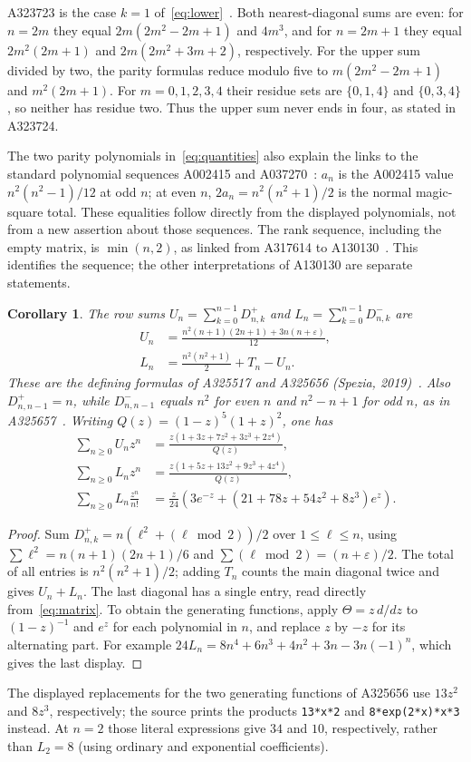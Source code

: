 \documentclass[11pt]{article}
\newtheorem{corollary}[theorem]{Corollary}
\newcommand{\eps}{\varepsilon}
\begin{document}
A323723 is the case $k=1$ of~\eqref{eq:lower}~\cite{s323723}.
Both nearest-diagonal sums are even: for $n=2m$ they equal
$2m(2m^2-2m+1)$ and $4m^3$, and for $n=2m+1$ they equal
$2m^2(2m+1)$ and $2m(2m^2+3m+2)$, respectively.
For the upper sum divided by two, the parity formulas reduce modulo five
to $m(2m^2-2m+1)$ and $m^2(2m+1)$. For $m=0,1,2,3,4$ their
residue sets are $\{0,1,4\}$ and $\{0,3,4\}$, so neither has residue
two. Thus the upper sum never ends in four, as stated in A323724.

The two parity polynomials in~\eqref{eq:quantities} also explain the
links to the standard polynomial sequences A002415 and
A037270~\cite{s002415,s037270}:
$a_n$ is the A002415 value $n^2(n^2-1)/12$ at odd $n$;
at even $n$, $2a_n=n^2(n^2+1)/2$ is the normal magic-square total.
These equalities follow directly from the displayed polynomials, not
from a new assertion about those sequences.
The rank sequence, including the empty matrix, is $\min(n,2)$, as linked
from A317614 to A130130~\cite{s130130}. This identifies the sequence;
the other interpretations of A130130 are separate statements.

\begin{corollary}\label{cor:triangles}
The row sums $U_n=\sum_{k=0}^{n-1}D^+_{n,k}$ and
$L_n=\sum_{k=0}^{n-1}D^-_{n,k}$ are
\begin{align*}
U_n&=\frac{n^2(n+1)(2n+1)+3n(n+\eps)}{12},\\
L_n&=\frac{n^2(n^2+1)}2+T_n-U_n.
\end{align*}
These are the defining formulas of A325517 and A325656
(Spezia, 2019)~\cite{s325517,s325656}. Also
$D^+_{n,n-1}=n$, while $D^-_{n,n-1}$ equals $n^2$ for even $n$
and $n^2-n+1$ for odd $n$, as in A325657~\cite{s325657}.
Writing $Q(z)=(1-z)^5(1+z)^2$, one has
\begin{align*}
\sum_{n\geq0}U_nz^n&=\frac{z(1+3z+7z^2+3z^3+2z^4)}{Q(z)},\\
\sum_{n\geq0}L_nz^n&=\frac{z(1+5z+13z^2+9z^3+4z^4)}{Q(z)},\\
\sum_{n\geq0}L_n\frac{z^n}{n!}
&=\frac{z}{24}\left(3e^{-z}+(21+78z+54z^2+8z^3)e^z\right).
\end{align*}
\end{corollary}
\begin{proof}
Sum $D^+_{n,k}=n(\ell^2+(\ell\bmod2))/2$ over $1\leq\ell\leq n$,
using $\sum\ell^2=n(n+1)(2n+1)/6$ and
$\sum(\ell\bmod2)=(n+\eps)/2$. The total of all entries is
$n^2(n^2+1)/2$; adding $T_n$ counts the main diagonal twice and
gives $U_n+L_n$. The last diagonal has a single entry, read directly
from~\eqref{eq:matrix}. To obtain the generating functions, apply
$\Theta=z\,d/dz$ to $(1-z)^{-1}$ and $e^z$ for each polynomial
in $n$, and replace $z$ by $-z$ for its alternating part.
For example
$24L_n=8n^4+6n^3+4n^2+3n-3n(-1)^n$, which gives the last display.
\end{proof}
The displayed replacements for the two generating functions of A325656
use $13z^2$ and $8z^3$, respectively; the source prints the products
\texttt{13*x*2} and \texttt{8*exp(2*x)*x*3} instead.
At $n=2$ those literal expressions give $34$ and $10$, respectively,
rather than $L_2=8$ (using ordinary and exponential coefficients).
\end{document}
